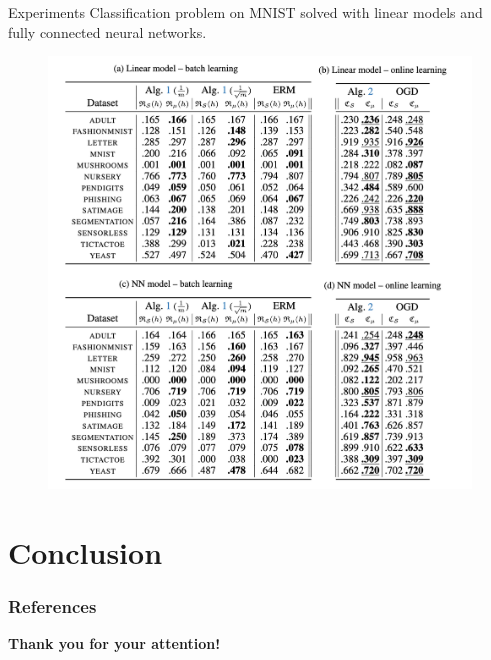 \documentclass{presentation}
\begin{document}
\begin{xframe}{Experiments}
    Classification problem on MNIST solved with linear models and fully connected neural networks.
    \begin{figure}
        \centering
        \includegraphics[scale=0.35]{figures/tables.png}
    \end{figure}
    
\end{xframe}

\section{Conclusion}









\appendix

\begin{frame}
  \frametitle{References}
  \printbibliography[title={References}]
 \end{frame}

\begin{xtitle}

\vspace{2.0cm}
{\bf Thank you for your attention!}\\

\end{xtitle}

 
\end{document}
